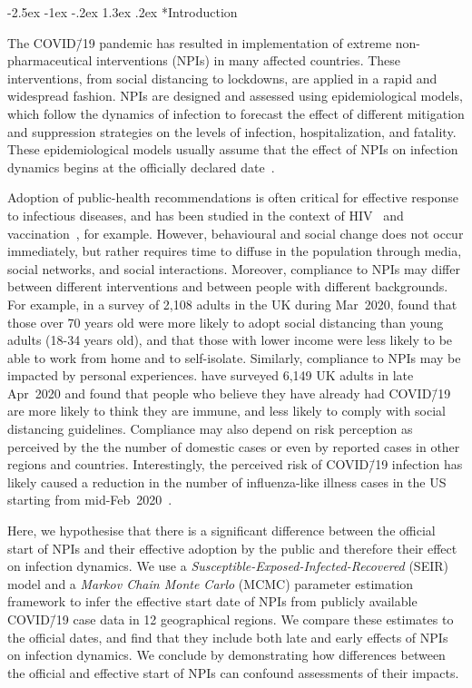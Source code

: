 \documentclass[12pt]{extarticle}
\makeatletter
\renewcommand\section{\@startsection {section}{1}{\z@}%
     {-2.5ex \@plus -1ex \@minus -.2ex}%
     {1.3ex \@plus.2ex}%
    {\Large\bfseries}}
\newcommand{\covid}{COVID\=/19 }
\makeatother
\begin{document}
\section*{Introduction}

The \covid pandemic has resulted in implementation of extreme non-pharmaceutical interventions (NPIs) in many affected countries. These interventions, from social distancing to lockdowns, are applied in a rapid and widespread fashion.
NPIs are designed and assessed using epidemiological models, which follow the dynamics of infection to forecast the effect of different mitigation and suppression strategies on the levels of infection, hospitalization, and fatality.
These epidemiological models usually assume that the effect of NPIs on infection dynamics begins at the officially declared date~\citep{Flaxman2020,Gatto2020,Li2020}.

Adoption of public-health recommendations is often critical for effective response to infectious diseases, and has been studied in the context of HIV~\citep{Kaufman2014} and vaccination~\citep{Dunn2015,Wiyeh2018}, for example.
However, behavioural and social change does not occur immediately, but rather requires time to diffuse in the population through media, social networks, and social interactions. 
Moreover, compliance to NPIs may differ between different interventions and between people with different backgrounds.
For example, in a survey of 2,108 adults in the UK during Mar~2020, \citet{Atchison2020} found that those over 70 years old were more likely to adopt social distancing than young adults (18-34 years old), and that those with lower income were less likely to be able to work from home and to self-isolate.
Similarly, compliance to NPIs may be impacted by personal experiences. \citet{Smith2020} have surveyed 6,149 UK adults in late Apr~2020 and found that people who believe they have already had \covid are more likely to think they are immune, and less likely to comply with social distancing guidelines. 
Compliance may also depend on risk perception as perceived by the the number of domestic cases or even by reported cases in other regions and countries.
Interestingly, the perceived risk of \covid infection has likely caused a reduction in the number of influenza-like illness cases in the US starting from mid-Feb~2020~\citep{Zipfel2020}.

Here, we hypothesise that there is a significant difference between the official start of NPIs and their effective adoption by the public and therefore their effect on infection dynamics.
We use a \textit{Susceptible-Exposed-Infected-Recovered} (SEIR) model and a \textit{Markov Chain Monte Carlo} (MCMC) parameter estimation framework to infer the effective start date of NPIs from publicly available \covid case data in 12 geographical regions.
We compare these estimates to the official dates, and find that they include both late and early effects of NPIs on infection dynamics.
We conclude by demonstrating how differences between the official and effective start of NPIs can confound assessments of their impacts.
\end{document}
